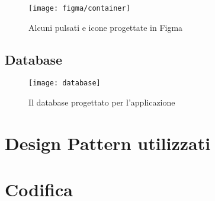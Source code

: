 \newpage

\begin{figure}[!h] 
    \centering 
    \texttt{[image: figma/container]} 
    \caption{Alcuni pulsati e icone progettate in Figma}
    \label{fig:conteinerfigma}
\end{figure}

\newpage

\subsection{Database}

\begin{figure}[!h] 
    \centering 
    \texttt{[image: database]} 
    \caption{Il database progettato per l'applicazione}
    \label{fig:database}
\end{figure}

\newpage

\section{Design Pattern utilizzati}

\section{Codifica} %
